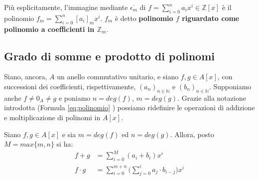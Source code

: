 \begin{itemize}
	\begin{center}
	\end{center}
	
	Più esplicitamente, l'immagine mediante $\overline{\epsilon_{m}}$ di $f = \sum_{i=0}^{n} a_{i}x^{i} \in \mathbb{Z}[x]$ è il polinomio $f_{m} = \sum_{i=0}^{n}[a_{i}]_{m}x^{i}$. $f_{m}$ è detto \textbf{polinomio $f$ riguardato come polinomio a coefficienti in $\mathbb{Z}_{m}$}.
\end{itemize}

\subsection{Grado di somme e prodotto di polinomi}
Siano, ancora, $A$ un anello commutativo unitario, e siano $f,g \in A[x]$, con successioni dei coefficienti, rispettivamente, $(a_{n})_{n \in \mathbb{N}}$ e $(b_{n})_{n \in \mathbb{N}}$. Supponiamo anche $f \neq 0_{A} \neq g$ e poniamo $n= deg(f)$, $m= deg(g)$. Grazie alla notazione introdotta (Formula \ref{eq:polinomio} ) possiamo ridefinire le operazioni di addizione e moltiplicazione di polinomi in $A[x]$.

\begin{propbox}
	Siano  $f,g \in A[x]$ e sia $m= deg(f)$ ed $n = deg(g)$. Allora, posto $M=max\{m,n\}$ si ha:
	\begin{eqnarray}
		f+g &= \sum_{i=0}^{M} (a_{i}+b_{i})x^{i}\\
		f \cdot g &= \sum_{i=0}^{m+n}\bigl(\sum_{j=0}^{i}a_{j}\cdot b_{i-j}\bigr)x^{i}
	\end{eqnarray}
\end{propbox}

